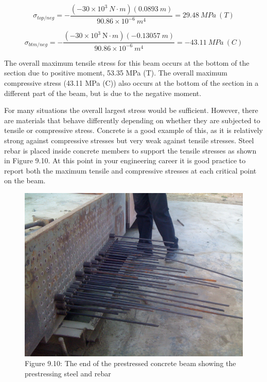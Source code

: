 \documentclass[
  letterpaper,
  DIV=11,
  numbers=noendperiod]{scrreprt}
\theoremstyle{definition}
\theoremstyle{remark}
\begin{document}
\begin{tcolorbox}
\begin{tcolorbox}
\[ \sigma_{top/neg}=-\frac{\left(-30 \times 10^3{~N}\cdot{m}\right)(0.0893{~m})}{90.86 \times 10^{-6}{~m}^4}=29.48{~MPa~(T)} \]

\[ \sigma_{btm/neg}=-\frac{\left(-30 \times 10^3 \mathrm{~N}\cdot{m}\right)(-0.13057{~m})}{90.86 \times 10^{-6}{~m}^4}=-43.11{~MPa}~{(C)} \]

The overall maximum tensile stress for this beam occurs at the bottom of
the section due to positive moment, 53.35 MPa (T). The overall maximum
compressive stress (43.11 MPa (C)) also occurs at the bottom of the
section in a different part of the beam, but is due to the negative
moment.

\end{tcolorbox}

\end{tcolorbox}

For many situations the overall largest stress would be sufficient.
However, there are materials that behave differently depending on
whether they are subjected to tensile or compressive stress. Concrete is
a good example of this, as it is relatively strong against compressive
stresses but very weak against tensile stresses. Steel rebar is placed
inside concrete members to support the tensile stresses as shown in
Figure 9.10. At this point in your engineering career it is good
practice to report both the maximum tensile and compressive stresses at
each critical point on the beam.

\begin{figure}[H]

{\centering \includegraphics[width=5.13542in,height=\textheight]{images/figure 9.10 (needs replacement).jpg}

}

\caption{Figure 9.10: The end of the prestressed concrete beam showing
the prestressing steel and rebar}

\end{figure}%
\end{document}

